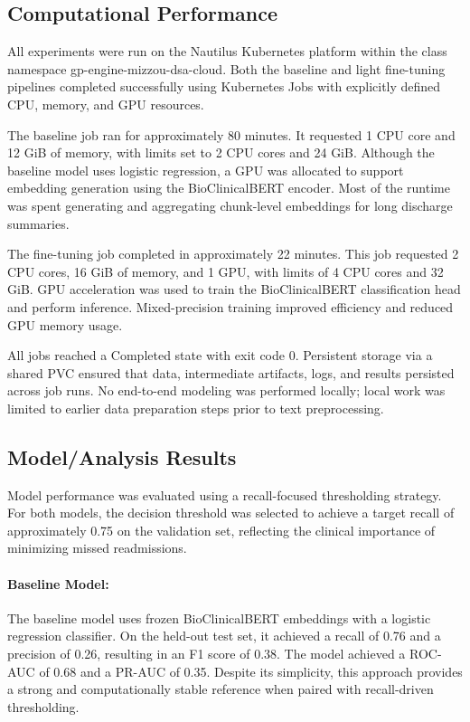 \documentclass[11pt]{article}
\begin{document}
\subsection{Computational Performance}

All experiments were run on the Nautilus Kubernetes platform within the class namespace gp-engine-mizzou-dsa-cloud. Both the baseline and light fine-tuning pipelines completed successfully using Kubernetes Jobs with explicitly defined CPU, memory, and GPU resources.

The baseline job ran for approximately 80 minutes. It requested 1 CPU core and 12 GiB of memory, with limits set to 2 CPU cores and 24 GiB. Although the baseline model uses logistic regression, a GPU was allocated to support embedding generation using the BioClinicalBERT encoder. Most of the runtime was spent generating and aggregating chunk-level embeddings for long discharge summaries.

The fine-tuning job completed in approximately 22 minutes. This job requested 2 CPU cores, 16 GiB of memory, and 1 GPU, with limits of 4 CPU cores and 32 GiB. GPU acceleration was used to train the BioClinicalBERT classification head and perform inference. Mixed-precision training improved efficiency and reduced GPU memory usage.

All jobs reached a Completed state with exit code 0. Persistent storage via a shared PVC ensured that data, intermediate artifacts, logs, and results persisted across job runs. No end-to-end modeling was performed locally; local work was limited to earlier data preparation steps prior to text preprocessing.

\subsection{Model/Analysis Results}

Model performance was evaluated using a recall-focused thresholding strategy. For both models, the decision threshold was selected to achieve a target recall of approximately 0.75 on the validation set, reflecting the clinical importance of minimizing missed readmissions.

\paragraph{Baseline Model:}
The baseline model uses frozen BioClinicalBERT embeddings with a logistic regression classifier. On the held-out test set, it achieved a recall of 0.76 and a precision of 0.26, resulting in an F1 score of 0.38. The model achieved a ROC-AUC of 0.68 and a PR-AUC of 0.35. Despite its simplicity, this approach provides a strong and computationally stable reference when paired with recall-driven thresholding.
\end{document}
